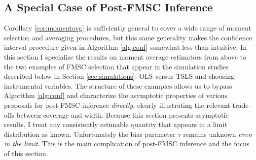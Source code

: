 \subsection{A Special Case of Post-FMSC Inference}
\label{sec:limitexperiment}
Corollary \ref{cor:momentavg} is sufficiently general to cover a wide range of moment selection and averaging procedures, but this same generality makes the confidence interval procedure given in Algorithm \ref{alg:conf} somewhat less than intuitive.
In this section I specialize the results on moment average estimators from above to the two examples of FMSC selection that appear in the simulation studies described below in Section \ref{sec:simulations}: OLS versus TSLS and choosing instrumental variables.
The structure of these examples allows us to bypass Algorithm \ref{alg:conf} and characterize the asymptotic properties of various proposals for post-FMSC inference \emph{directly}, clearly illustrating the relevant trade-offs between coverage and width.
Because this section presents asymptotic results, I treat any consistently estimable quantity that appears in a limit distribution as known.
Unfortunately the bias parameter $\tau$ remains unknown \emph{even in the limit}.
This is the main complication of post-FMSC inference and the focus of this section.

